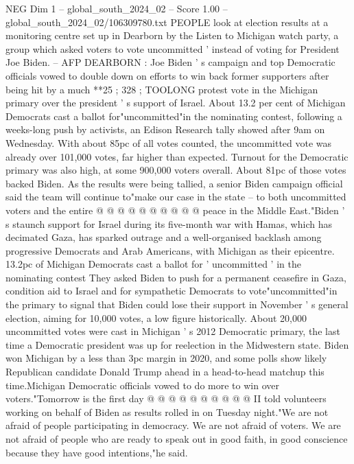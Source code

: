 \begin{textsample}{NEG Dim 1 – global\_south\_2024\_02 – Score 1.00 – global\_south\_2024\_02/106309780.txt}  \label{ex:f1_neg_251}
PEOPLE look at election results at a monitoring centre set up in Dearborn by the Listen to Michigan watch party, a group which asked voters to vote uncommitted ' instead of voting for President Joe Biden. -- AFP DEARBORN : Joe Biden ' s campaign and top Democratic officials vowed to double down on efforts to win back former supporters after being hit by a much **25 ; 328 ; TOOLONG protest vote in the Michigan primary over the president ' s support of Israel.
About 13.2 per cent of Michigan Democrats cast a ballot for"uncommitted"in the nominating contest, following a weeks-long push by activists, an Edison Research tally showed after 9am on Wednesday.
With about 85pc of all votes counted, the uncommitted vote was already over 101,000 votes, far higher than expected.
Turnout for the Democratic primary was also high, at some 900,000 voters overall.
About 81pc of those votes backed Biden.
As the results were being tallied, a senior Biden campaign official said the team will continue to"make our case in the state -- to both uncommitted voters and the entire @ @ @ @ @ @ @ @ @ @ peace in the Middle East."Biden ' s staunch support for Israel during its five-month war with Hamas, which has decimated Gaza, has sparked outrage and a well-organised backlash among progressive Democrats and Arab Americans, with Michigan as their epicentre. 13.2pc of Michigan Democrats cast a ballot for ' uncommitted ' in the nominating contest They asked Biden to push for a permanent ceasefire in Gaza, condition aid to Israel and for sympathetic Democrats to vote"uncommitted"in the primary to signal that Biden could lose their support in November ' s general election, aiming for 10,000 votes, a low figure historically.
About 20,000 uncommitted votes were cast in Michigan ' s 2012 Democratic primary, the last time a Democratic president was up for reelection in the Midwestern state.
Biden won Michigan by a less than 3pc margin in 2020, and some polls show likely Republican candidate Donald Trump ahead in a head-to-head matchup this time.Michigan Democratic officials vowed to do more to win over voters."Tomorrow is the first day @ @ @ @ @ @ @ @ @ @ II told volunteers working on behalf of Biden as results rolled in on Tuesday night."We are not afraid of people participating in democracy.
We are not afraid of voters.
We are not afraid of people who are ready to speak out in good faith, in good conscience because they have good intentions,"he said.

\end{textsample}
